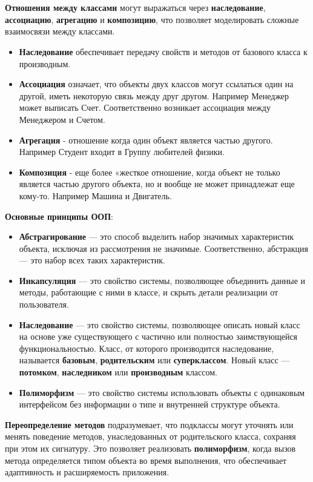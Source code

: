 \documentclass[a4paper, 12pt]{report}
\numberwithin{equation}{section}
\begin{document}
	\\\\
	\textbf{Отношения между классами} могут выражаться через \textbf{наследование}, \textbf{ассоциацию}, \textbf{агрегацию} и \textbf{композицию}, что позволяет моделировать сложные взаимосвязи между классами. 
	\begin{itemize}
		\item \textbf{Наследование} обеспечивает передачу свойств и методов от базового класса к производным.
		\item \textbf{Ассоциация} означает, что объекты двух классов могут ссылаться один на другой, иметь некоторую связь между друг другом. Например Менеджер может выписать Счет. Соответственно возникает ассоциация между Менеджером и Счетом.
		\item \textbf{Агрегация} - отношение когда один объект является частью другого. Например Студент входит в Группу любителей физики.
		\item \textbf{Композиция} - еще более «жесткое отношение, когда объект не только является частью другого объекта, но и вообще не может принадлежат еще кому-то. Например Машина и Двигатель.
	\end{itemize}
	\textbf{Основные принципы ООП}:
	\begin{itemize}
		\item \textbf{Абстрагирование} — это способ выделить набор значимых характеристик объекта, исключая из рассмотрения не значимые. Соответственно, абстракция — это набор всех таких характеристик.
		\item \textbf{Инкапсуляция} — это свойство системы, позволяющее объединить данные и методы, работающие с ними в классе, и скрыть детали реализации от пользователя.
		\item \textbf{Наследование} — это свойство системы, позволяющее описать новый класс на основе уже существующего с частично или полностью заимствующейся функциональностью. Класс, от которого производится наследование, называется \textbf{базовым}, \textbf{родительским} или \textbf{суперклассом}. Новый класс — \textbf{потомком}, \textbf{наследником} или \textbf{производным} классом.
		\item \textbf{Полиморфизм} — это свойство системы использовать объекты с одинаковым интерфейсом без информации о типе и внутренней структуре объекта.
	\end{itemize}
	\textbf{Переопределение методов} подразумевает, что подклассы могут уточнять или менять поведение методов, унаследованных от родительского класса, сохраняя при этом их сигнатуру. Это позволяет реализовать \textbf{полиморфизм}, когда вызов метода определяется типом объекта во время выполнения, что обеспечивает адаптивность и расширяемость приложения.
\end{document}
